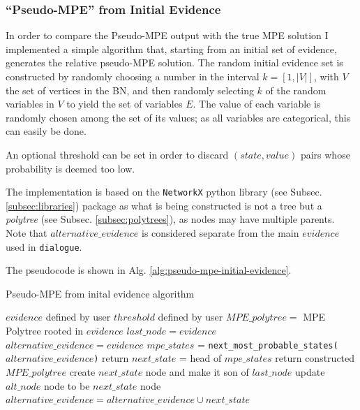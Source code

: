 \subsubsection{\enquote{Pseudo-MPE} from Initial Evidence} \label{subsubsec:pseudo-mpe}
In order to compare the Pseudo-MPE output with the true MPE solution I implemented a simple algorithm that, starting from an initial set of evidence, generates the relative pseudo-MPE solution.
The random initial evidence set is constructed by randomly choosing a number in the interval $k = [ 1, |V| ]$, with $V$ the set of vertices in the BN, and then randomly selecting $k$ of the random variables in $V$ to yield the set of variables $E$.
The value of each variable is randomly chosen among the set of its values; as all variables are categorical, this can easily be done.

An optional threshold can be set in order to discard $(state,value)$ pairs whose probability is deemed too low.

The implementation is based on the \texttt{NetworkX} python library (see Subsec. \ref{subsec:libraries}) package as what is being constructed is not a tree but a \textit{polytree} (see Subsec. \ref{subsec:polytrees}), as nodes may have multiple parents.
Note that $alternative\_evidence$ is considered separate from the main $evidence$ used in \texttt{dialogue}.

The pseudocode is shown in Alg. \ref{alg:pseudo-mpe-initial-evidence}.

\begin{algorithm}[htp!]
	\caption{Pseudo-MPE from inital evidence algorithm}
	\label{alg:pseudo-mpe-initial-evidence}
	\begin{algorithmic}[1]
		\State $evidence$ defined by user
		\State $threshold$ defined by user
		\State $MPE\_polytree = $ MPE Polytree rooted in $evidence$
		\State $last\_node = evidence$
		\State $alternative\_evidence = evidence$ 
			\State $mpe\_states$ = \texttt{next\_most\_probable\_states($alternative\_evidence$)}
				\State return
			\Else
				\State $next\_state$ = head of $mpe\_states$ 
					\State return constructed $MPE\_polytree$
				\EndIf
				\State create $next\_state$ node and make it son of $last\_node$
				\State update $alt\_node$ node to be $next\_state$ node
				\State $alternative\_evidence = alternative\_evidence \cup next\_state$
			\EndIf
		\EndWhile
	\end{algorithmic}
\end{algorithm}

